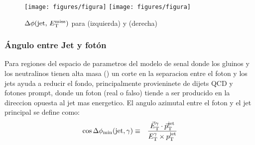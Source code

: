 
\begin{figure}[th!]
 \centering
 \texttt{[image: figures/figura]} %
 \texttt{[image: figures/figura]} %
 \caption{$\Delta \phi \text{(jet, \ensuremath{E_{\mathrm{T}}^{\mathrm{miss}}})}$ para {\SRL} (izquierda) y {\SRH} (derecha)}
 \label{fig:jet-MET-phi_3SR}
\end{figure}

\subsubsection{Ángulo entre Jet y fotón}

Para regiones del espacio de parametros del modelo de senal
donde los gluinos y los neutralinos tienen alta masa ({\SRH})
un corte en la separacion entre el foton y los jets ayuda a
reducir el fondo, principalmente provieninete de dijets QCD y
fotones prompt, donde un foton (real o falso) tiende a ser
producido en la direccion opuesta al jet mas energetico.
El angulo azimutal entre el foton y el jet principal se define
como:
\begin{eqnarray} \label{eq:dphi}
  \cos \Delta \phi_{\mathrm{min}}(\mathrm{jet},\gamma) &\equiv& \frac{\vec{E}_\mathrm{T}^{\gamma} \cdot \vec{p}_\mathrm{T}^\mathrm{jet}}{{E}_\mathrm{T}^{\gamma} \times p_{\mathrm{T}}^\mathrm{jet}}
\end{eqnarray}
%


